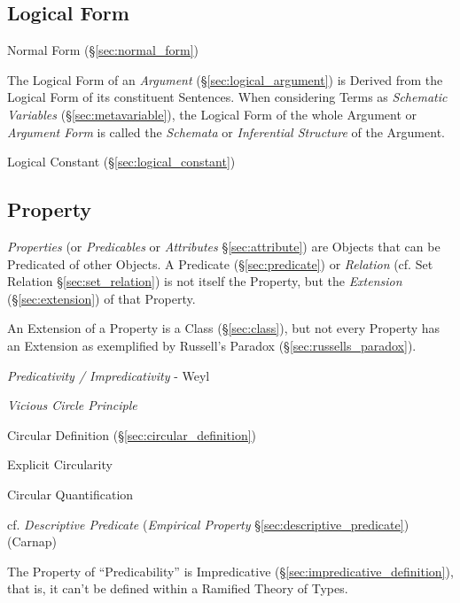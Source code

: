 \subsection{Logical Form}\label{sec:logical_form}

Normal Form (\S\ref{sec:normal_form})

The Logical Form of an \emph{Argument} (\S\ref{sec:logical_argument})
is Derived from the Logical Form of its constituent Sentences. When
considering Terms as \emph{Schematic Variables}
(\S\ref{sec:metavariable}), the Logical Form of the whole Argument or
\emph{Argument Form} is called the \emph{Schemata} or
\emph{Inferential Structure} of the Argument.



Logical Constant (\S\ref{sec:logical_constant})



\subsection{Property}\label{sec:property}

\emph{Properties} (or \emph{Predicables} or \emph{Attributes}
\S\ref{sec:attribute}) are Objects that can be Predicated of other
Objects. A Predicate (\S\ref{sec:predicate}) or \emph{Relation} (cf.
Set Relation \S\ref{sec:set_relation}) is not itself the Property, but
the \emph{Extension} (\S\ref{sec:extension}) of that Property.

An Extension of a Property is a Class (\S\ref{sec:class}), but not
every Property has an Extension as exemplified by Russell's Paradox
(\S\ref{sec:russells_paradox}).

\emph{Predicativity / Impredicativity} - Weyl

\emph{Vicious Circle Principle}

Circular Definition (\S\ref{sec:circular_definition})

Explicit Circularity

Circular Quantification

cf. \emph{Descriptive Predicate} (\emph{Empirical Property}
\S\ref{sec:descriptive_predicate}) (Carnap)

The Property of ``Predicability'' is Impredicative
(\S\ref{sec:impredicative_definition}), that is, it can't be defined
within a Ramified Theory of Types.\cite{kleene52}

